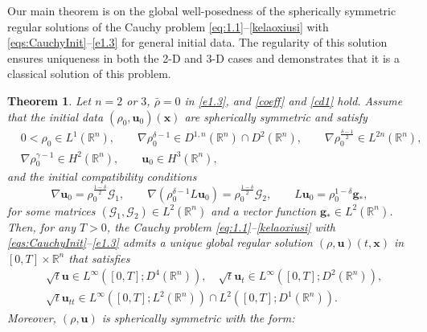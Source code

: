 \documentclass[11pt,reqno]{amsart}
\newtheorem{thm}{Theorem}[section]
\numberwithin{rk}{section}
\numberwithin{prop}{section}
\numberwithin{mydef}{section}
\numberwithin{lem}{section}
\numberwithin{equation}{section}
\numberwithin{thm}{section}
\begin{document}
Our main theorem is on the global well-posedness of the spherically symmetric regular solutions 
of the Cauchy problem \eqref{eq:1.1}--\eqref{kelaoxiusi} with \eqref{eqs:CauchyInit}--\eqref{e1.3}  for general initial data. The regularity of this solution ensures uniqueness in both the 2-D and 3-D cases and demonstrates that it is a classical solution of this problem.

\begin{thm}\label{th1-high}
Let $n=2$ or $3$, $\bar\rho=0$ in \eqref{e1.3}, and \eqref{coeff} and \eqref{cd1} hold. Assume that the initial data  $(\rho_0, \boldsymbol{u}_0)(\boldsymbol{x})$ are spherically symmetric and satisfy 
\begin{equation}\label{id1-high}
\begin{aligned}
&0<\rho_0\in L^1(\mathbb{R}^n),\qquad \nabla \rho_0^{\delta-1}\in  D^{1,n}(\mathbb{R}^n)\cap D^{2}(\mathbb{R}^n),\qquad \nabla\rho_0^\frac{\delta-1}{2}\in L^{2n}(\mathbb{R}^n),\\
& \nabla\rho_0^{\gamma-1}\in H^2(\mathbb{R}^n),\qquad\boldsymbol{u}_0 \in H^3(\mathbb{R}^n), 
\end{aligned}
\end{equation}
and the initial compatibility conditions 
\begin{equation}\label{th78zx}
\nabla \boldsymbol{u}_0=\rho^{\frac{1-\delta}{2}}_0 \mathcal{G}_1,\qquad
\nabla (\rho^{\delta-1}_0L\boldsymbol{u}_0)=\rho^{\frac{1-\delta}{2}}_0\mathcal{G}_2,\qquad  L\boldsymbol{u}_0= \rho^{1-\delta}_0\boldsymbol{g}_*,
\end{equation}
for some matrices $(\mathcal{G}_1,\mathcal{G}_2) \in L^2(\mathbb{R}^n)$ and a vector function  $\boldsymbol{g}_*\in L^2(\mathbb{R}^n)$. Then, for any $T>0$,  the Cauchy problem \eqref{eq:1.1}{\rm--}\eqref{kelaoxiusi} with \eqref{eqs:CauchyInit}{\rm--}\eqref{e1.3}  admits a unique global regular solution $(\rho,\boldsymbol{u})(t,\boldsymbol{x})$
in $[0,T]\times\mathbb{R}^n$ that satisfies
\begin{equation}\label{er2-high}
\begin{aligned}
&\sqrt{t}\boldsymbol{u}\in L^\infty([0,T];D^4(\mathbb{R}^n)),\quad \sqrt{t}\boldsymbol{u}_t\in L^\infty([0,T];D^2(\mathbb{R}^n)),\\
&\sqrt{t}\boldsymbol{u}_{tt}\in L^\infty([0,T];L^2(\mathbb{R}^n))\cap L^2([0,T];D^1(\mathbb{R}^n)).
\end{aligned}
\end{equation}
Moreover,  $(\rho, \boldsymbol{u})$ is spherically symmetric with the form{\rm:}

\end{thm}
\end{document}
